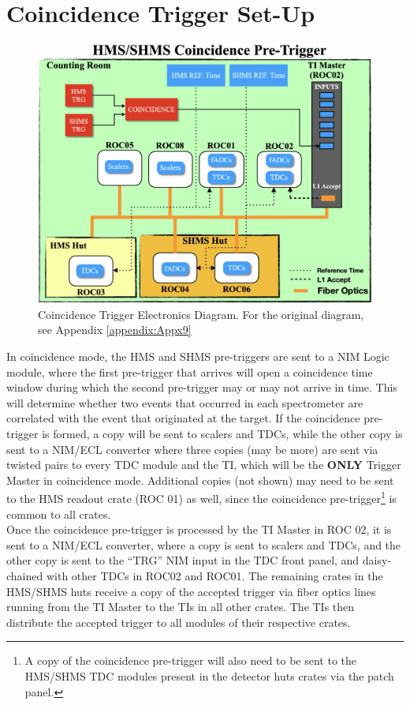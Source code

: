 \documentclass[11pt]{article}
\begin{document}
\section{Coincidence Trigger Set-Up}
\begin{figure}[h!]
  \centering
  \includegraphics[scale=0.35]{images/Coin_diagram.png}
  \caption{Coincidence Trigger Electronics Diagram. For the original diagram, see Appendix \ref{appendix:Appx9}}
  \label{fig:Coin_TRG}
\end{figure}
\indent In coincidence mode, the HMS and SHMS pre-triggers are sent to a NIM Logic module, where the first pre-trigger that arrives will open
a coincidence time window during which the second pre-trigger may or may not arrive in time. This will determine whether two events that occurred in
each spectrometer are correlated with the event that originated at the target. If the coincidence pre-trigger is formed, a copy will be sent to
scalers and TDCs, while the other copy is sent to a NIM/ECL converter where three copies (may be more) are sent via twisted pairs to every TDC module and the TI, which will be the \textbf{ONLY} Trigger Master in coincidence mode. Additional copies (not shown) may need to be sent to the HMS readout crate (ROC 01) as well, since the coincidence pre-trigger\footnote{A copy of the coincidence pre-trigger will also need to be sent to the
  HMS/SHMS TDC modules present in the detector huts crates via the patch panel.} is common to all crates. \\
\indent Once the coincidence pre-trigger is processed by the TI Master in ROC 02, it is sent to a NIM/ECL converter, where a copy is sent to scalers and TDCs, and the other copy is sent to the ``TRG'' NIM input in the TDC front panel, and daisy-chained with other TDCs in ROC02 and ROC01. The remaining crates in the HMS/SHMS huts receive a copy of the accepted trigger via fiber optics lines running from the TI Master to the TIs in all other crates. The TIs then distribute the accepted trigger to all modules of their respective crates.
\end{document}
